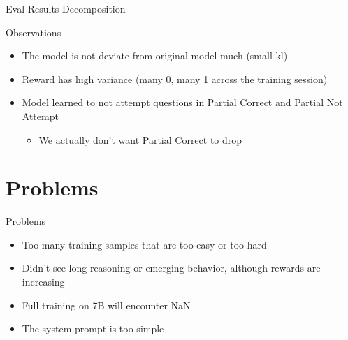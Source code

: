 \documentclass[aspectratio=169]{beamer}
\begin{document}
\begin{frame}{Eval Results Decomposition}
    \begin{table}
        \caption{Evaluation results breakdown by training steps}
    \end{table}
\end{frame}

\begin{frame}{Observations}
    \begin{itemize}
        \item The model is not deviate from original model much (small kl)
        \item Reward has high variance (many 0, many 1 across the training session)
        \item Model learned to not attempt questions in Partial Correct and Partial Not Attempt
        \begin{itemize}
            \item We actually don't want Partial Correct to drop
        \end{itemize}
    \end{itemize}
\end{frame}

\section{Problems}
\begin{frame}{Problems}
    \begin{itemize}
        \item Too many training samples that are too easy or too hard
        \item Didn't see long reasoning or emerging behavior, although rewards are increasing
        \item Full training on 7B will encounter NaN
        \item The system prompt is too simple
    \end{itemize}
\end{frame}
\end{document}
